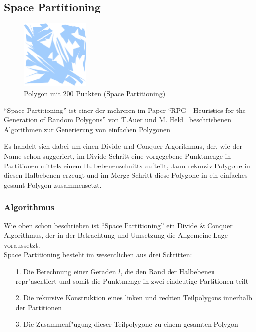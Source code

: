 
\subsection{Space Partitioning}

  \begin{figure}[h]
    \begin{center}
      \includegraphics[width=0.3\textwidth]{img/spacepart200.eps}
    \end{center}
    \caption{Polygon mit 200 Punkten (Space Partitioning)}
    \label{fig:icb14}
  \end{figure}

  ``Space Partitioning'' ist einer der mehreren im Paper ``RPG - Heuristics
  for the   Generation of Random Polygons'' von T.Auer und M.
  Held~\cite{held98polygons}   beschriebenen Algorithmen zur Generierung von
  einfachen Polygonen.


  Es handelt sich dabei um einen Divide und Conquer Algorithmus, der, wie der
  Name schon suggeriert, im Divide-Schritt eine vorgegebene Punktmenge in
  Partitionen mittels einem Halbebenenschnitts aufteilt, dann rekursiv Polygone
  in diesen Halbebenen erzeugt und im Merge-Schritt diese Polygone in ein
  einfaches gesamt Polygon zusammensetzt.

  \subsubsection{Algorithmus}

    Wie oben schon beschrieben ist ``Space Partitioning'' ein Divide \& Conquer
    Algorithmus, der in der Betrachtung und Umsetzung die Allgemeine Lage
    voraussetzt. \\

    \noindent
    Space Partitioning besteht im wesentlichen aus drei Schritten:
    \begin{itemize}
      \item[1.] Die Berechnung einer Geraden $l$, die den Rand der Halbebenen 
            repr"asentiert und somit die Punktmenge in zwei eindeutige 
            Partitionen teilt
      \item[2.] Die rekursive Konstruktion eines linken und rechten 
            Teilpolygons innerhalb der Partitionen
      \item[3.] Die Zusammenf"ugung dieser Teilpolygone zu einem gesamten 
            Polygon
    \end{itemize}

